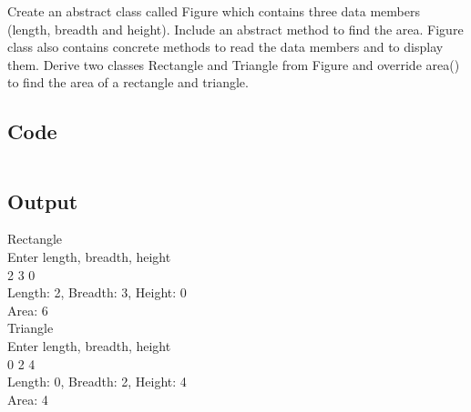 \documentclass[../main.tex]{subfiles}
\begin{document}
Create an abstract class called Figure which contains three data members
(length, breadth and height). Include an abstract method to find the area.
Figure class also contains concrete methods to read the data members and to
display them. Derive two classes Rectangle and Triangle from Figure and
override area() to find the area of a rectangle and triangle.

\subsection{Code}
\inputminted[frame=lines, breaklines, breakanywhere, numberblanklines=false]{java}{./programs/prog5/Main.java}

\subsection{Output}
Rectangle \\
Enter length, breadth, height \\
2 3 0 \\
Length: 2, Breadth: 3, Height: 0 \\
Area: 6 \\
Triangle \\
Enter length, breadth, height \\
0 2 4 \\
Length: 0, Breadth: 2, Height: 4 \\
Area: 4 \\
\end{document}
